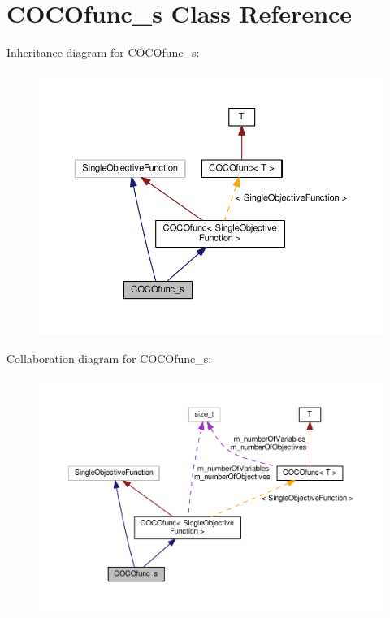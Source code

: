 \hypertarget{classCOCOfunc__s}{}\section{C\+O\+C\+Ofunc\+\_\+s Class Reference}
\label{classCOCOfunc__s}


Inheritance diagram for C\+O\+C\+Ofunc\+\_\+s\+:\nopagebreak
\begin{figure}[H]
\begin{center}
\leavevmode
\includegraphics[width=350pt]{classCOCOfunc__s__inherit__graph}
\end{center}
\end{figure}


Collaboration diagram for C\+O\+C\+Ofunc\+\_\+s\+:\nopagebreak
\begin{figure}[H]
\begin{center}
\leavevmode
\includegraphics[width=350pt]{classCOCOfunc__s__coll__graph}
\end{center}
\end{figure}
